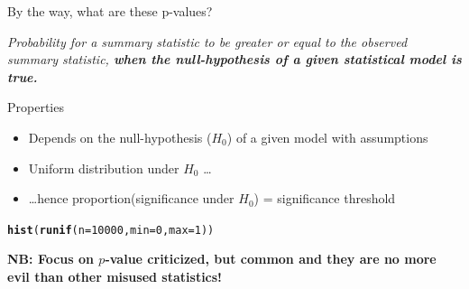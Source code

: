 \documentclass[10pt]{beamer}\usepackage[]{graphicx}\usepackage[]{color}
\makeatletter
\newcommand{\hlnum}[1]{\textcolor[rgb]{0.686,0.059,0.569}{#1}}%
\newcommand{\hlstd}[1]{\textcolor[rgb]{0.345,0.345,0.345}{#1}}%
\newcommand{\hlkwc}[1]{\textcolor[rgb]{0.333,0.667,0.333}{#1}}%
\newcommand{\hlkwd}[1]{\textcolor[rgb]{0.737,0.353,0.396}{\textbf{#1}}}%
\newenvironment{kframe}{%
 \def\at@end@of@kframe{}%
 \ifinner\ifhmode%
  \def\at@end@of@kframe{\end{minipage}}%
  \begin{minipage}{\columnwidth}%
 \fi\fi%
 \def\FrameCommand##1{\hskip\@totalleftmargin \hskip-\fboxsep
 \colorbox{shadecolor}{##1}\hskip-\fboxsep
     \hskip-\linewidth \hskip-\@totalleftmargin \hskip\columnwidth}%
 \MakeFramed {\advance\hsize-\width
   \@totalleftmargin\z@ \linewidth\hsize
   \@setminipage}}%
 {\par\unskip\endMakeFramed%
 \at@end@of@kframe}
\newenvironment{knitrout}{}{} %
\makeatother
\begin{document}
\begin{frame}[fragile]{By the way, what are these p-values?}%

\textit{Probability for a summary statistic to be greater or equal to the observed summary statistic, \textbf{when the null-hypothesis of a given statistical model is true.}}

\pause

\begin{exampleblock}{Properties}
  \begin{itemize}
    \item Depends on the null-hypothesis ($H_0$) of a given model with assumptions
    \item Uniform distribution under $H_0$ \dots
    \item \dots hence proportion(significance under $H_0$) = significance threshold
  \end{itemize}
\end{exampleblock}
\pause

\begin{knitrout}
\color{fgcolor}\begin{kframe}
\begin{alltt}
  \hlkwd{hist}\hlstd{(} \hlkwd{runif}\hlstd{(}\hlkwc{n} \hlstd{=} \hlnum{10000}\hlstd{,} \hlkwc{min} \hlstd{=} \hlnum{0}\hlstd{,} \hlkwc{max}\hlstd{=}\hlnum{1}\hlstd{) )}
\end{alltt}
\end{kframe}
\end{knitrout}

\pause
\textbf{NB: Focus on $p$-value criticized, but common and they are no more evil than other misused statistics!}
\end{frame}
\end{document}
